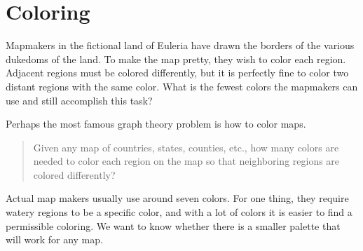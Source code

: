 \documentclass[12pt]{article}
\begin{document}
\section{Coloring}

\begin{activity}
Mapmakers in the fictional land of Euleria have drawn the borders of the various dukedoms of the land.  To make the map pretty, they wish to color each region.  Adjacent regions must be colored differently, but it is perfectly fine to color two distant regions with the same color.  What is the fewest colors the mapmakers can use and still accomplish this task?

\begin{center}
\end{center}

\end{activity}

Perhaps the most famous graph theory problem is how to color maps.

\begin{quote}
 Given any map of countries, states, counties, etc., how many colors are needed to color each region on the map so that neighboring regions are colored differently?
\end{quote}

Actual map makers usually use around seven colors.  For one thing, they require watery regions to be a specific color, and with a lot of colors it is easier to find a permissible coloring.  We want to know whether there is a smaller palette that will work for any map.
\end{document}
